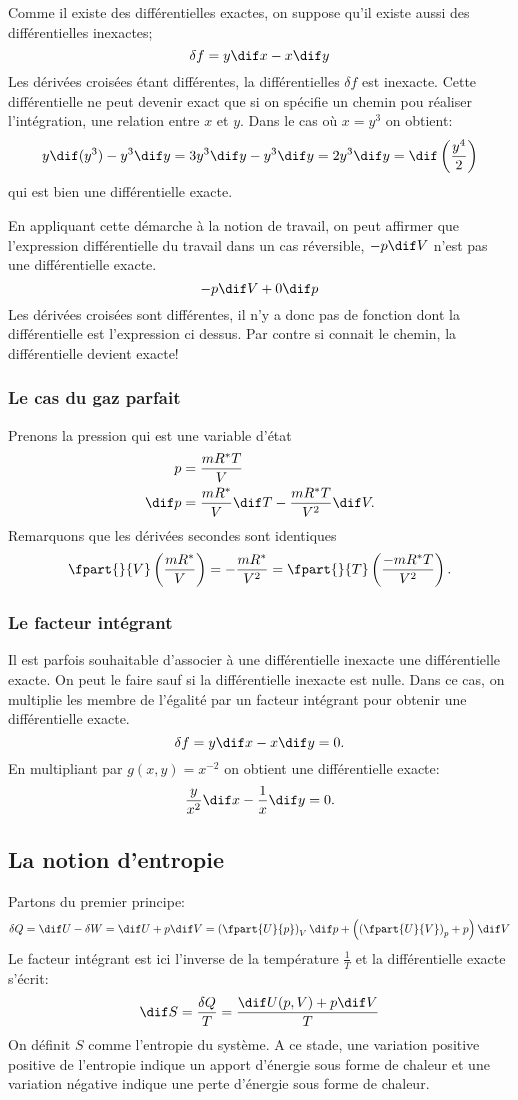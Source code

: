 Comme il existe des différentielles exactes,
on suppose qu'il existe aussi des différentielles inexactes;
\[ \delta f = y\dif x - x\dif y \]
Les dérivées croisées étant différentes,
la différentielles $\delta f$ est inexacte.
Cette différentielle ne peut devenir exact que si
on spécifie un chemin pou réaliser l'intégration, une relation entre $x$ et $y$.
Dans le cas où $x = y^3$ on obtient:
\[  y\dif(y^3)-y^3\dif y = 3y^3\dif y-y^3\dif y
= 2y^3\dif y = \dif\left(\frac{y^4}{2}\right) \]
qui est bien une différentielle exacte.

En appliquant cette démarche à la notion de travail,
on peut affirmer que l'expression différentielle du travail
dans un cas réversible, $-p\dif V$ n'est pas une différentielle exacte.
\[ -p\dif V+0\dif p \]
Les dérivées croisées sont différentes,
il n'y a donc pas de fonction dont la différentielle est l'expression ci dessus.
Par contre si connait le chemin, la différentielle devient exacte!
\subsubsection{Le cas du gaz parfait}
Prenons la pression qui est une variable d'état
\begin{align*}
  p & = \frac{mR^*T}{V}\\
  \dif p & = \frac{mR^*}{V}\dif T-\frac{mR^*T}{V^2}\dif V.
\end{align*}
Remarquons que les dérivées secondes sont identiques
\[ \fpart{}{V} \left(\frac{mR^*}{V}\right) =
-\frac{mR^*}{V^2} = \fpart{}{T}
\left(\frac{-mR^*T}{V^2}\right). \]

\subsubsection{Le facteur intégrant}
Il est parfois souhaitable d'associer à une différentielle
inexacte une différentielle exacte.
On peut le faire sauf si la différentielle inexacte est nulle.
Dans ce cas, on multiplie les membre de l'égalité par un facteur intégrant
pour obtenir une différentielle exacte.
\[ \delta f = y\dif x-x\dif y = 0. \]
En multipliant par $g(x,y) = x^{-2}$ on obtient une différentielle exacte:
\[ \frac y {x^2} \dif x -\frac 1x\dif y = 0. \]
\subsection{La notion d'entropie}
Partons du premier principe:
\[ \delta Q = \dif U - \delta W = \dif U +p\dif V =
\left(\fpart{U}{p}\right)_V \dif p +
\left ( \left ( \fpart{U}{V}\right)_p + p \right)\dif V \]
Le facteur intégrant est ici l'inverse de la température
$\frac{1}{T}$ et la différentielle exacte s'écrit:
\[ \dif S = \frac{\delta Q}{T} = \frac{\dif U(p,V)+p\dif V }T \]
On définit $S$ comme l'entropie du système.
A ce stade, une variation positive positive de l'entropie
indique un apport d'énergie sous forme de chaleur et
une variation négative indique une perte d'énergie sous forme de chaleur.

